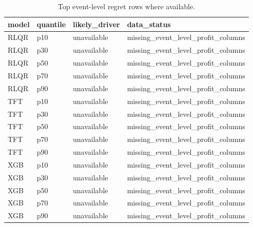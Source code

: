 \begin{table}[htbp]
\centering
\small
\begin{tabular}{llll}
\toprule
model & quantile & likely\_driver & data\_status \\
\midrule
RLQR & p10 & unavailable & missing\_event\_level\_profit\_columns \\
RLQR & p30 & unavailable & missing\_event\_level\_profit\_columns \\
RLQR & p50 & unavailable & missing\_event\_level\_profit\_columns \\
RLQR & p70 & unavailable & missing\_event\_level\_profit\_columns \\
RLQR & p90 & unavailable & missing\_event\_level\_profit\_columns \\
TFT & p10 & unavailable & missing\_event\_level\_profit\_columns \\
TFT & p30 & unavailable & missing\_event\_level\_profit\_columns \\
TFT & p50 & unavailable & missing\_event\_level\_profit\_columns \\
TFT & p70 & unavailable & missing\_event\_level\_profit\_columns \\
TFT & p90 & unavailable & missing\_event\_level\_profit\_columns \\
XGB & p10 & unavailable & missing\_event\_level\_profit\_columns \\
XGB & p30 & unavailable & missing\_event\_level\_profit\_columns \\
XGB & p50 & unavailable & missing\_event\_level\_profit\_columns \\
XGB & p70 & unavailable & missing\_event\_level\_profit\_columns \\
XGB & p90 & unavailable & missing\_event\_level\_profit\_columns \\
\bottomrule
\end{tabular}
\caption{Top event-level regret rows where available.}
\label{tab:top\_regret\_events}
\end{table}
